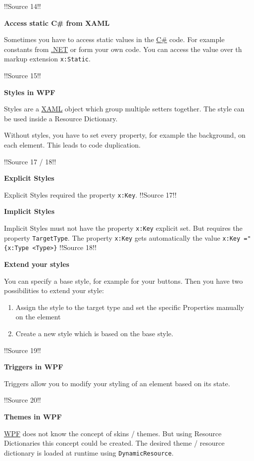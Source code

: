 \documentclass[10pt,twoside,landscape]{article}
\begin{document}
\begin{multicols}{4}
!!Source 14!!

\textbf{Access static C\# from XAML}

Sometimes you have to access static values in the \href{../../../roam/20211003114158-c.org}{C\#} code.
For example constants from \href{../../../roam/20211003114703-net.org}{.NET} or form your own code.
You can access the value over th markup extension \texttt{x:Static}.

!!Source 15!!

\textbf{Styles in WPF}

Styles are a \href{../../../roam/20211123162058-xaml.org}{XAML} object which group multiple setters together.
The style can be used inside a Resource Dictionary.

Without styles, you have to set every property, for example the background, on each element.
This leads to code duplication.

!!Source 17 / 18!!

\textbf{Explicit Styles}

Explicit Styles required the property \texttt{x:Key}.
!!Source 17!!

\textbf{Implicit Styles}

Implicit Styles must not have the property \texttt{x:Key} explicit set.
But requires the property \texttt{TargetType}.
The property \texttt{x:Key} gets automatically the value \texttt{x:Key ="\{x:Type <Type>\}}
!!Source 18!!

\textbf{Extend your styles}

You can specify a base style, for example for your buttons.
Then you have two possibilities to extend your style:
\begin{enumerate}
\item Assign the style to the target type and set the specific Properties manually on the element
\item Create a new style which is based on the base style.
\end{enumerate}

!!Source 19!!

\textbf{Triggers in WPF}

Triggers allow you to modify your styling of an element based on its state.

!!Source 20!!

\textbf{Themes in WPF}

\href{../../../roam/20211123162923-wpf.org}{WPF} does not know the concept of skins / themes.
But using Resource Dictionaries this concept could be created.
The desired theme / resource dictionary is loaded at runtime using \texttt{DynamicResource}.



\end{multicols}
\end{document}
